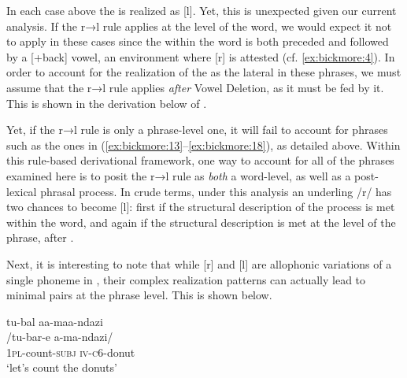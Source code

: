 \documentclass[output=paper,modfonts,nonflat,
colorlinks, citecolor=brown,
draftmode,
]{langsci/langscibook}
\begin{document}
\largerpage
In each case above the  is realized as [l]. Yet, this is unexpected given our current analysis. If the r→l rule applies at the level of the word, we would expect it not to apply in these cases since the  within the word is both preceded and followed by a [+back] vowel, an environment where [r] is attested (cf. \ref{ex:bickmore:4}). In order to account for the realization of the  as the lateral in these phrases, we must assume that the r→l rule applies \textit{after} Vowel Deletion, as it must be fed by it. This is shown in the derivation below of . 

\ea\label{ex:bickmore:21}
\z

Yet, if the r→l rule is only a phrase-level one, it will fail to account for phrases such as the ones in (\ref{ex:bickmore:13}--\ref{ex:bickmore:18}), as detailed above. Within this rule-based derivational framework, one way to account for all of the phrases examined here is to posit the r→l rule as \textit{both} a word-level, as well as a post-lexical phrasal process. %
%
 In crude terms, under this analysis an underling /r/ has two chances to become [l]: first if the structural description of the process is met within the word, and again if the structural description is met at the level of the phrase, after . 

Next, it is interesting to note that while [r] and [l] are allophonic variations of a single phoneme in , their complex realization%
%
 patterns can actually lead to minimal pairs at the phrase level. This is shown below.

\ea\label{ex:bickmore:22}
\glll    tu-bal aa-maa-ndazi\\
    /tu-bar-e a-ma-ndazi/	\\
\textsc{1pl-}\textup{count}\textsc{-subj} \textsc{iv-\textsc{c6}-}\textup{donut}\\
\glt    ‘let’s count the donuts’
\z
\end{document}
